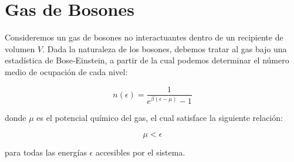 \documentclass[a4paper,11pt]{article}
\begin{document}
\newpage
\section{Gas de Bosones}

Consideremos un gas de bosones no interactuantes dentro de un
recipiente de volumen $V$.
Dada la naturaleza de los bosones, debemos tratar al gas bajo una
estadística de Bose-Einstein, a partir de la cual podemos determinar el
número medio de ocupación de cada nivel:

$$ n(\epsilon) = \frac{1}{e^{\beta(\epsilon - \mu)} - 1} $$

\noindent donde $\mu$ es el potencial químico del gas, el cual satisface la
siguiente relación:

$$ \mu < \epsilon $$

\noindent para todas las energías $\epsilon$ accesibles por el sistema.
\end{document}
